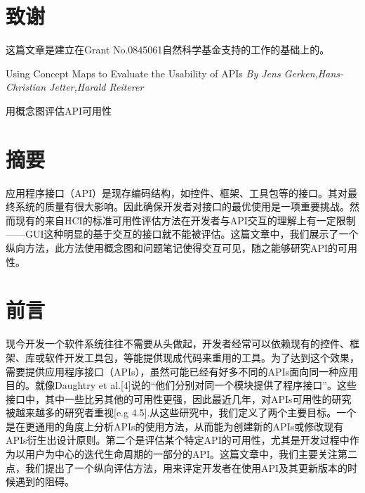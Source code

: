 \section*{致谢}
这篇文章是建立在Grant No.0845061自然科学基金支持的工作的基础上的。

\cleardoublepage

\begin{center}
{\heiti{}Using Concept Maps to Evaluate the Usability of APIs}
\textsl{By Jens Gerken,Hans-Christian Jetter,Harald Reiterer }

{\heiti{} 用概念图评估API可用性}
\end{center}


\section*{摘要}
应用程序接口（API）是现存编码结构，如控件、框架、工具包等的接口。其对最终系统的质量有很大影响。因此确保开发者对接口的最优使用是一项重要挑战。然而现有的来自HCI的标准可用性评估方法在开发者与API交互的理解上有一定限制——GUI这种明显的基于交互的接口就不能被评估。这篇文章中，我们展示了一个纵向方法，此方法使用概念图和问题笔记使得交互可见，随之能够研究API的可用性。

\section*{前言}
现今开发一个软件系统往往不需要从头做起，开发者经常可以依赖现有的控件、框架、库或软件开发工具包，等能提供现成代码来重用的工具。为了达到这个效果，需要提供应用程序接口（APIs），虽然可能已经有好多不同的APIs面向同一种应用目的。就像Daughtry et al.[4]说的“他们分别对同一个模块提供了程序接口”。这些接口中，其中一些比另其他的可用性更强，因此最近几年，对APIs可用性的研究被越来越多的研究者重视[e.g 4.5].从这些研究中，我们定义了两个主要目标。一个是在更通用的角度上分析APIs的使用方法，从而能为创建新的APIs或修改现有APIs衍生出设计原则。第二个是评估某个特定API的可用性，尤其是开发过程中作为以用户为中心的迭代生命周期的一部分的API。这篇文章中，我们主要关注第二点，我们提出了一个纵向评估方法，用来评定开发者在使用API及其更新版本的时候遇到的阻碍。
